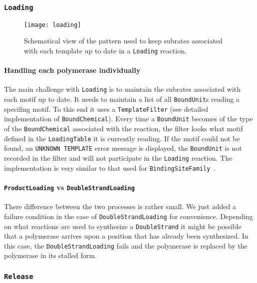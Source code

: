\subsubsection{\texttt{Loading}}

\begin{figure}[!h]
  \centering
  \texttt{[image: loading]}
  \caption{Schematical view of the pattern used to keep subrates associated with each template up to date in a \texttt{Loading} reaction.}
  \label{fig:det_loading}
\end{figure}

\paragraph{Handling each polymerase individually} The main challenge with \texttt{Loading} is to maintain the subrates associated with each motif up to date. It needs to maintain a list of all \texttt{BoundUnit}s reading a specifing motif. To this end it uses a \texttt{TemplateFilter} (see detailed implementation of \texttt{BoundChemical}). Every time a \texttt{BoundUnit} becomes of the type of the \texttt{BoundChemical} associated with the reaction, the filter looks what motif defined in the \texttt{LoadingTable} it is currently reading. If the motif could not be found, an \texttt{UNKNOWN TEMPLATE} error message is displayed, the \texttt{BoundUnit} is not recorded in the filter and will not participate in the \texttt{Loading} reaction. The implementation is very similar to that used for \texttt{BindingSiteFamily}~.

\paragraph{\texttt{ProductLoading} vs \texttt{DoubleStrandLoading}} There difference between the two processes is rather small. We just added a failure condition in the case of \texttt{DoubleStrandLoading} for convenience. Depending on what reactions are used to synthesize a \texttt{DoubleStrand} it might be possible that a polymerase arrives upon a position that has already been synthesized. In this case, the \texttt{DoubleStrandLoading} fails and the polymerase is replaced by the polymerase in its stalled form.

\subsubsection{\texttt{Release}}

